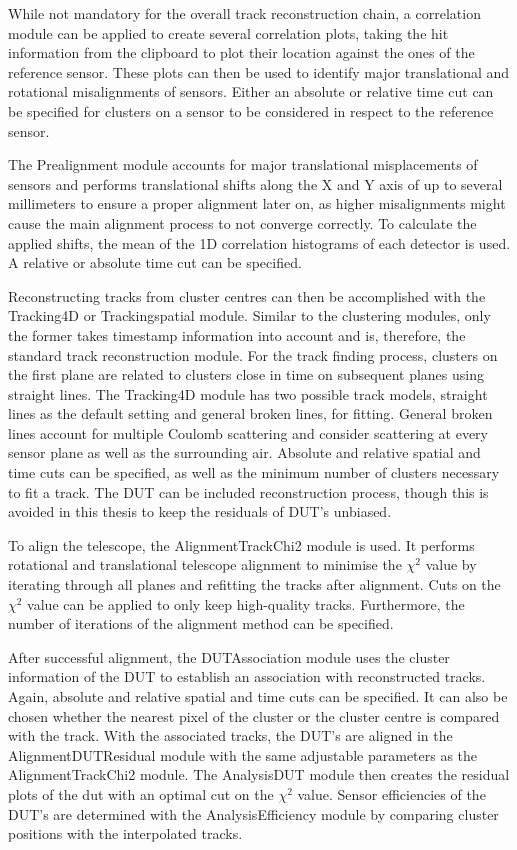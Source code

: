 While not mandatory for the overall track reconstruction chain, a correlation module can be applied to create several correlation plots, taking the hit information
from the clipboard to plot their location against the ones of the reference sensor. These plots can then be used to identify major translational and
rotational misalignments of sensors.  Either an absolute or relative time cut can be specified for clusters on a sensor to be considered in respect to
the reference sensor.

The Prealignment module accounts for major translational misplacements of sensors and performs translational shifts along the X and Y axis of up to several millimeters to ensure a proper alignment later on, as higher misalignments might cause the main alignment process to not converge correctly.
To calculate the applied shifts, the mean of the 1D correlation
histograms of each detector is used. A  relative or absolute time cut can be specified.

Reconstructing tracks from cluster centres can then be accomplished with the Tracking4D or Trackingspatial module. Similar to the clustering modules, only the former
takes timestamp information into account and is, therefore, the standard track reconstruction module. For the track finding process, clusters on the first plane are
related to clusters close in time on subsequent planes using straight lines.
The Tracking4D module has two possible track models, straight lines as the default setting and general
broken lines, for fitting. General broken lines account for multiple Coulomb scattering and consider scattering at every sensor plane as well as the surrounding air.
Absolute and relative spatial and time cuts can be specified, as well as the minimum number
of clusters necessary to fit a track. The DUT can be included reconstruction process, though this is avoided in this thesis to keep the residuals of DUT's unbiased.


To align the telescope, the AlignmentTrackChi2 module is used. It performs rotational and translational telescope
alignment to minimise the $\chi^2$ value by iterating through all planes and refitting the tracks after alignment. Cuts on the $\chi^2$ value can be
applied to only keep high-quality tracks. Furthermore, the number of iterations of the alignment method can be specified.

After successful alignment, the DUTAssociation module uses the cluster information of the DUT to establish an association with reconstructed tracks. Again, absolute
and relative spatial and time cuts can be specified. It can also be chosen whether the nearest pixel of the cluster or the cluster centre is compared with the track.
With the associated tracks, the DUT's are aligned in the AlignmentDUTResidual module with the same adjustable parameters as the AlignmentTrackChi2 module.
The AnalysisDUT module then creates the residual plots of the dut with an optimal cut on the $\chi^2$ value. Sensor efficiencies of the DUT's are determined with the
AnalysisEfficiency module by comparing cluster positions with the interpolated tracks.


